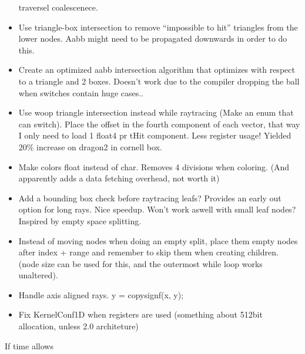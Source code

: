\begin{itemize}
  traversel coalescenece. \checkmark
\item Use triangle-box intersection to remove ``impossible to hit''
  triangles from the lower nodes. Aabb might need to be propagated
  downwards in order to do this.
\item Create an optimized aabb intersection algorithm that
optimizes with respect to a triangle and 2 boxes. Doesn't work due to
the compiler dropping the ball when switches contain huge cases..
\item Use woop triangle intersection instead while raytracing (Make an
  enum that can switch). Place the offset in the fourth component of
  each vector, that way I only need to load 1 float4 pr tHit
  component. Less register usage! Yielded 20\% increase on dragon2 in
  cornell box.
\item Make colors float instead of char. Removes 4 divisions when
  coloring. (And apparently adds a data fetching overhead, not worth
  it)
\item Add a bounding box check before raytracing leafs? Provides an
  early out option for long rays. Nice speedup. Won't work aswell with
  small leaf nodes? Inspired by empty space splitting.
\item Instead of moving nodes when doing an empty split, place them
  empty nodes after index + range and remember to skip them when
  creating children. (node size can be used for this, and the
  outermost while loop works unaltered).
\item Handle axis aligned rays. y = copysignf(x, y);

\color{red}
\item Fix KernelConf1D when registers are used (something about 512bit
  allocation, unless 2.0 architeture)
\end{itemize}

If time allows

